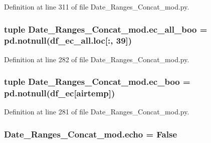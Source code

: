 Definition at line 311 of file Date\+\_\+\+Ranges\+\_\+\+Concat\+\_\+mod.\+py.

\hypertarget{namespace_date___ranges___concat__mod_a29acc74f3cb873d58197efbf7c3ee5c8}{}
\subsubsection[{ec\+\_\+all\+\_\+boo}]{\setlength{\rightskip}{0pt plus 5cm}tuple Date\+\_\+\+Ranges\+\_\+\+Concat\+\_\+mod.\+ec\+\_\+all\+\_\+boo = pd.\+notnull(df\+\_\+ec\+\_\+all.\+loc\mbox{[}\+:, 39\mbox{]})}\label{namespace_date___ranges___concat__mod_a29acc74f3cb873d58197efbf7c3ee5c8}


Definition at line 282 of file Date\+\_\+\+Ranges\+\_\+\+Concat\+\_\+mod.\+py.

\hypertarget{namespace_date___ranges___concat__mod_ae828195b9eb1dc7afb1c10e2edfc5d2f}{}
\subsubsection[{ec\+\_\+boo}]{\setlength{\rightskip}{0pt plus 5cm}tuple Date\+\_\+\+Ranges\+\_\+\+Concat\+\_\+mod.\+ec\+\_\+boo = pd.\+notnull({\bf df\+\_\+ec}\mbox{[}\textquotesingle{}airtemp\textquotesingle{}\mbox{]})}\label{namespace_date___ranges___concat__mod_ae828195b9eb1dc7afb1c10e2edfc5d2f}


Definition at line 281 of file Date\+\_\+\+Ranges\+\_\+\+Concat\+\_\+mod.\+py.

\hypertarget{namespace_date___ranges___concat__mod_ac457be966cc9724d04bdf39556d0cb28}{}
\subsubsection[{echo}]{\setlength{\rightskip}{0pt plus 5cm}Date\+\_\+\+Ranges\+\_\+\+Concat\+\_\+mod.\+echo = False}\label{namespace_date___ranges___concat__mod_ac457be966cc9724d04bdf39556d0cb28}


